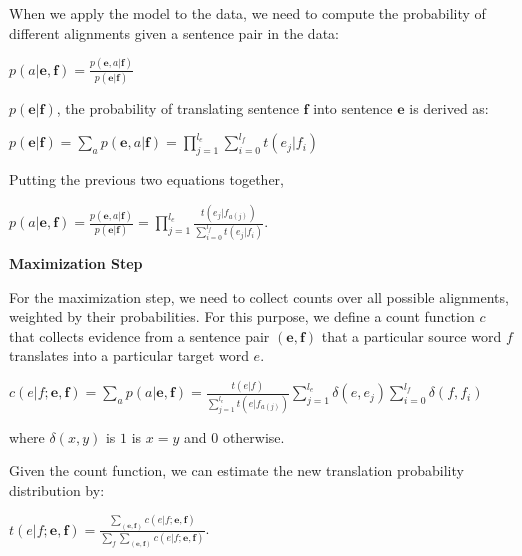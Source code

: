 \documentclass[10pt]{report}
\theoremstyle{plain}
\begin{document}
{When we apply the model to the data, we need to compute the
probability of different alignments given a sentence pair in the
data:

\begin{center}
$p(a|\textbf{e},\textbf{f}) =
\frac{p(\textbf{e},a|\textbf{f})}{p(\textbf{e}|\textbf{f})}$
\end{center}

$p(\textbf{e}|\textbf{f})$, the probability of translating sentence
$\textbf{f}$ into sentence $\textbf{e}$ is derived as:

\begin{center}

$p(\textbf{e}|\textbf{f}) = \sum_a p(\textbf{e},a|\textbf{f}) =
\prod_{j=1}^{l_e} \sum_{i=0}^{l_f}t(e_j|f_i)$
\end{center}

Putting the previous two equations together,

\begin{center}

 $p(a|\textbf{e},\textbf{f}) =
\frac{p(\textbf{e},a|\textbf{f})}{p(\textbf{e}|\textbf{f})}
=\prod_{j=1}^{l_e} \frac {t(e_j | f_{a(j)})}{\sum_{i=0}^{l_f}
t(e_j|f_i)}$.


\end{center}

\textbf{Maximization Step}

For the maximization step, we need to collect counts over all
possible alignments, weighted by their probabilities. For this
purpose, we define a count function $c$ that collects evidence from
a sentence pair $(\textbf{e},\textbf{f})$ that a particular source
word $f$  translates into a particular target word $e$.

\begin{center}

$c(e|f;\textbf{e},\textbf{f}) = \sum_a p(a|\textbf{e},\textbf{f}) =
\frac{t(e|f)}{\sum_{j=1}^{l_e}t(e|f_{a(j)})} \sum_{j=1}^{l_e}
\delta(e,e_j)\sum_{i=0}^{l_f}\delta(f,f_i)$

\end{center}

where $\delta(x,y)$ is $1$ is $x=y$ and $0$ otherwise.

Given the count function, we can estimate the new translation
probability distribution by:

\begin{center}
$t(e|f;\textbf{e},\textbf{f}) =
\frac{\sum_{(\textbf{e},\textbf{f})}c(e|f;\textbf{e},\textbf{f})}{\sum_f\sum_{(\textbf{e},\textbf{f})}c(e|f;\textbf{e},\textbf{f})}$.
\end{center}


}
\end{document}
